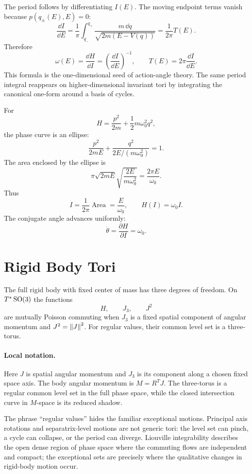 The period follows by differentiating \(I(E)\). The moving endpoint terms
vanish because \(p(q_\pm(E),E)=0\):
\[
  \frac{\dd I}{\dd E}
  =
  \frac1{\pi}\int_{q_-}^{q_+}
  \frac{m\,\dd q}{\sqrt{2m(E-V(q))}}
  =
  \frac1{2\pi}T(E).
\]
Therefore
\[
  \boxed{
  \omega(E)=\frac{\dd H}{\dd I}
  =
  \left(\frac{\dd I}{\dd E}\right)^{-1},
  \qquad
  T(E)=2\pi\frac{\dd I}{\dd E}.
  }
\]
This formula is the one-dimensional seed of action-angle theory. The
same period integral reappears on higher-dimensional invariant tori by
integrating the canonical one-form around a basis of cycles.

\begin{example}
For
\[
  H=\frac{p^2}{2m}+\frac12m\omega_0^2q^2,
\]
the phase curve is an ellipse:
\[
  \frac{p^2}{2mE}+\frac{q^2}{2E/(m\omega_0^2)}=1.
\]
The area enclosed by the ellipse is
\[
  \pi\sqrt{2mE}\sqrt{\frac{2E}{m\omega_0^2}}
  =
  \frac{2\pi E}{\omega_0}.
\]
Thus
\[
  I=\frac{1}{2\pi}\operatorname{Area}=\frac{E}{\omega_0},
  \qquad
  H(I)=\omega_0 I.
\]
The conjugate angle advances uniformly:
\[
  \dot\theta=\frac{\partial H}{\partial I}=\omega_0.
\]
\end{example}

\section{Rigid Body Tori}
\label{sec:rigid-body-tori}

The full rigid body with fixed center of mass has three degrees of freedom. On
\(T^*\operatorname{SO}(3)\) the functions
\[
  H,\qquad J_3,\qquad J^2
\]
are mutually Poisson commuting when \(J_3\) is a fixed spatial component of
angular momentum and \(J^2=\left\lVert J\right\rVert^2\). For regular values, their common level
set is a three-torus.

\paragraph{Local notation.}
Here \(J\) is spatial angular momentum and \(J_3\) is its component along a
chosen fixed space axis.  The body angular momentum is \(M=R^TJ\).  The
three-torus is a regular common level set in the full phase space, while the
closed intersection curve in \(M\)-space is its reduced shadow.

The phrase ``regular values'' hides the familiar exceptional motions. Principal
axis rotations and separatrix-level motions are not generic tori: the level set
can pinch, a cycle can collapse, or the period can diverge. Liouville
integrability describes the open dense region of phase space where the
commuting flows are independent and compact; the exceptional sets are precisely
where the qualitative changes in rigid-body motion occur.

